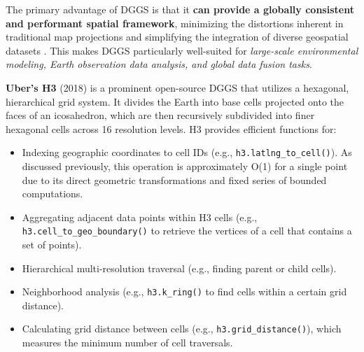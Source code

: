 \begin{multicols}{2}
The primary advantage of DGGS is that it \textbf{can provide a globally consistent and performant spatial framework}, minimizing the distortions inherent in traditional map projections and simplifying the integration of diverse geospatial datasets \cite{ESRI_DGGS_Intro_2023, XDGGS_Kmoch_2024}. 
This makes DGGS particularly well-suited for \textit{large-scale environmental modeling, Earth observation data analysis, and global data fusion tasks}.

\textbf{Uber's H3} (2018) is a prominent open-source DGGS that utilizes a hexagonal, hierarchical grid system. 
It divides the Earth into base cells projected onto the faces of an icosahedron, which are then recursively subdivided into finer hexagonal cells across 16 resolution levels\cite{H3_Overview}. 
H3 provides efficient functions for:
\begin{itemize}
    \item Indexing geographic coordinates to cell IDs (e.g., \texttt{h3.latlng\_to\_cell()}). As discussed previously, this operation is approximately O(1) for a single point due to its direct geometric transformations and fixed series of bounded computations.
    \item Aggregating adjacent data points within H3 cells (e.g., \texttt{h3.cell\_to\_geo\_boundary()} to retrieve the vertices of a cell that contains a set of points).
    \item Hierarchical multi-resolution traversal (e.g., finding parent or child cells).
    \item Neighborhood analysis (e.g., \texttt{h3.k\_ring()} to find cells within a certain grid distance).
    \item Calculating grid distance between cells (e.g., \texttt{h3.grid\_distance()}), which measures the minimum number of cell traversals.
\end{itemize}


\end{multicols}
